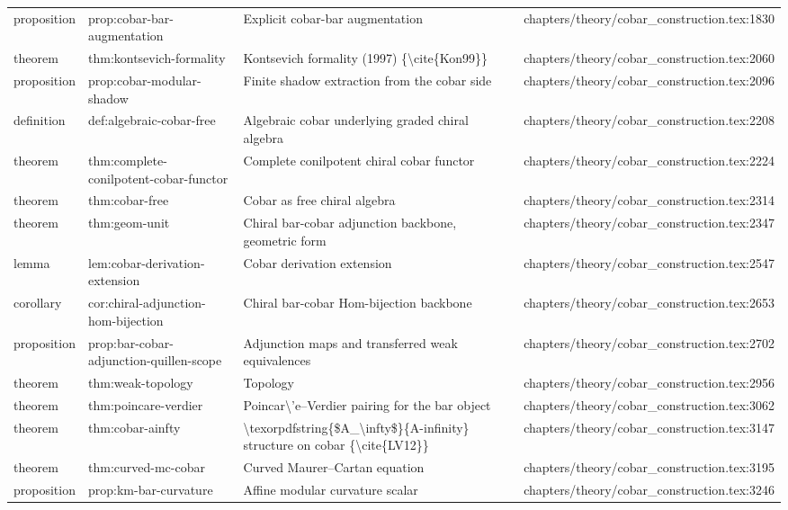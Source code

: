 \documentclass[11pt]{article}
\begin{document}
\begin{longtable}{L{0.10\textwidth}L{0.26\textwidth}L{0.42\textwidth}L{0.22\textwidth}}
proposition & prop:cobar-bar-augmentation & Explicit cobar-bar augmentation & chapters/theory/cobar\_construction.tex:1830\\
theorem & thm:kontsevich-formality & Kontsevich formality (1997) \{\textbackslash{}cite\{Kon99\}\} & chapters/theory/cobar\_construction.tex:2060\\
proposition & prop:cobar-modular-shadow & Finite shadow extraction from the cobar side & chapters/theory/cobar\_construction.tex:2096\\
definition & def:algebraic-cobar-free & Algebraic cobar underlying graded chiral algebra & chapters/theory/cobar\_construction.tex:2208\\
theorem & thm:complete-conilpotent-cobar-functor & Complete conilpotent chiral cobar functor & chapters/theory/cobar\_construction.tex:2224\\
theorem & thm:cobar-free & Cobar as free chiral algebra & chapters/theory/cobar\_construction.tex:2314\\
theorem & thm:geom-unit & Chiral bar-cobar adjunction backbone, geometric form & chapters/theory/cobar\_construction.tex:2347\\
lemma & lem:cobar-derivation-extension & Cobar derivation extension & chapters/theory/cobar\_construction.tex:2547\\
corollary & cor:chiral-adjunction-hom-bijection & Chiral bar-cobar Hom-bijection backbone & chapters/theory/cobar\_construction.tex:2653\\
proposition & prop:bar-cobar-adjunction-quillen-scope & Adjunction maps and transferred weak equivalences & chapters/theory/cobar\_construction.tex:2702\\
theorem & thm:weak-topology & Topology & chapters/theory/cobar\_construction.tex:2956\\
theorem & thm:poincare-verdier & Poincar\textbackslash{}'e--Verdier pairing for the bar object & chapters/theory/cobar\_construction.tex:3062\\
theorem & thm:cobar-ainfty & \textbackslash{}texorpdfstring\{\$A\_\textbackslash{}infty\$\}\{A-infinity\} structure on cobar \{\textbackslash{}cite\{LV12\}\} & chapters/theory/cobar\_construction.tex:3147\\
theorem & thm:curved-mc-cobar & Curved Maurer--Cartan equation & chapters/theory/cobar\_construction.tex:3195\\
proposition & prop:km-bar-curvature & Affine modular curvature scalar & chapters/theory/cobar\_construction.tex:3246\\

\end{longtable}
\end{document}
